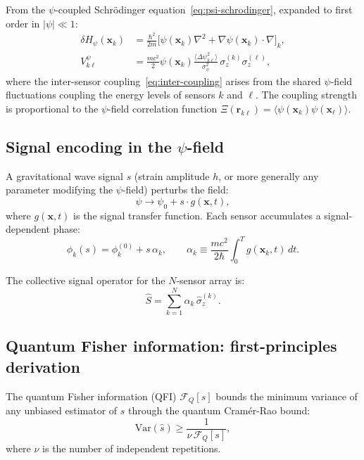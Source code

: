 \documentclass[aps,prl,twocolumn,superscriptaddress,showpacs]{revtex4-2}
\theoremstyle{definition}
\begin{document}
From the $\psi$-coupled Schr\"odinger
equation~\eqref{eq:psi-schrodinger}, expanded to first order in
$|\psi| \ll 1$:
\begin{align}
\delta H_\psi(\mathbf{x}_k) &= \frac{\hbar^2}{2m}
\bigl[\psi(\mathbf{x}_k)\nabla^2
+ \nabla\psi(\mathbf{x}_k)\cdot\nabla\bigr]_k, \label{eq:local-coupling}\\
V_{k\ell}^\psi &= \frac{m c^2}{2}\psi(\mathbf{x}_k)
\frac{\langle\Delta\psi_{k\ell}^2\rangle}{\sigma_\psi^2}\,
\sigma_z^{(k)}\sigma_z^{(\ell)}, \label{eq:inter-coupling}
\end{align}
where the inter-sensor coupling~\eqref{eq:inter-coupling} arises from
the shared $\psi$-field fluctuations coupling the energy levels of
sensors $k$ and $\ell$. The coupling strength is proportional to the
$\psi$-field correlation function
$\Xi(\mathbf{r}_{k\ell}) = \langle\psi(\mathbf{x}_k)
\psi(\mathbf{x}_\ell)\rangle$.

\subsection{Signal encoding in the $\psi$-field}

A gravitational wave signal $s$ (strain amplitude $h$, or more generally
any parameter modifying the $\psi$-field) perturbs the field:
\begin{equation}
\psi \to \psi_0 + s\cdot g(\mathbf{x},t),
\label{eq:signal-encoding}
\end{equation}
where $g(\mathbf{x},t)$ is the signal transfer function. Each sensor
accumulates a signal-dependent phase:
\begin{equation}
\phi_k(s) = \phi_k^{(0)} + s\,\alpha_k, \qquad
\alpha_k \equiv \frac{mc^2}{2\hbar}\int_0^T g(\mathbf{x}_k,t)\,dt.
\label{eq:signal-phase}
\end{equation}

The collective signal operator for the $N$-sensor array is:
\begin{equation}
\hat{S} = \sum_{k=1}^N \alpha_k\,\hat{\sigma}_z^{(k)}.
\label{eq:signal-operator}
\end{equation}

\subsection{Quantum Fisher information: first-principles derivation}
\label{sec:qfi-derivation}

The quantum Fisher information (QFI) $\mathcal{F}_Q[s]$ bounds the
minimum variance of any unbiased estimator of $s$ through the quantum
Cram\'er-Rao bound:
\begin{equation}
\mathrm{Var}(\hat{s}) \geq \frac{1}{\nu\,\mathcal{F}_Q[s]},
\label{eq:qcrb}
\end{equation}
where $\nu$ is the number of independent repetitions.
\end{document}
